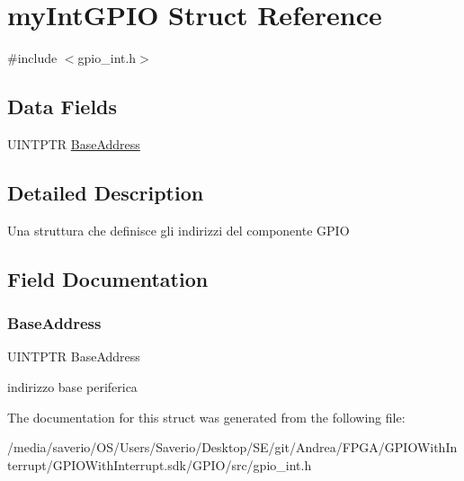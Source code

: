 \hypertarget{structmyIntGPIO}{}\section{my\+Int\+G\+P\+IO Struct Reference}
\label{structmyIntGPIO}


{\ttfamily \#include $<$gpio\+\_\+int.\+h$>$}

\subsection*{Data Fields}
\textbf{ }\par
\begin{DoxyCompactItemize}
\item 
U\+I\+N\+T\+P\+TR \hyperlink{structmyIntGPIO_ab50cdd3296629cf5c64dc386145fb2ee}{Base\+Address}
\end{DoxyCompactItemize}



\subsection{Detailed Description}
Una struttura che definisce gli indirizzi del componente G\+P\+IO 

\subsection{Field Documentation}
\mbox{\label{structmyIntGPIO_ab50cdd3296629cf5c64dc386145fb2ee}} 
\subsubsection{\texorpdfstring{Base\+Address}{BaseAddress}}
{\footnotesize\ttfamily U\+I\+N\+T\+P\+TR Base\+Address}

indirizzo base periferica 

The documentation for this struct was generated from the following file\+:\begin{DoxyCompactItemize}
\item 
/media/saverio/\+O\+S/\+Users/\+Saverio/\+Desktop/\+S\+E/git/\+Andrea/\+F\+P\+G\+A/\+G\+P\+I\+O\+With\+Interrupt/\+G\+P\+I\+O\+With\+Interrupt.\+sdk/\+G\+P\+I\+O/src/gpio\+\_\+int.\+h\end{DoxyCompactItemize}
